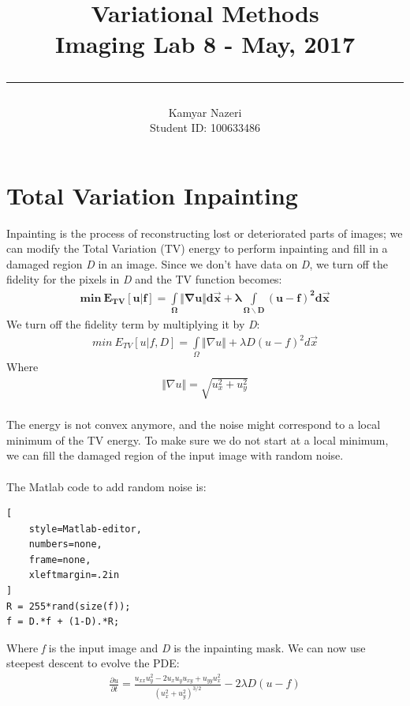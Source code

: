 \documentclass[a4paper,11pt]{article}
\begin{document}
\title{
	\Huge \textbf {Variational Methods}
    \\ [0.2cm]
	\LARGE Imaging Lab 8 - May, 2017
    \\ [0.5cm]
    \hrule
}

\date{}

\author{
		\Large Kamyar Nazeri \\
		\large Student ID: 100633486 }

\maketitle
\newpage

\section*{Total Variation Inpainting}
Inpainting is the process of reconstructing lost or deteriorated parts of images; we can modify the Total Variation (TV) energy to perform inpainting and fill in a damaged region \emph{D} in an image. Since we don't have data on \emph{D}, we turn off the fidelity for the pixels in \emph{D} and the TV function becomes:
\begin{align*}
\boldsymbol{min\ E_{TV}[u|f] = \int\limits_{\Omega} \Vert\nabla u\Vert d\vec{x} + \lambda \int\limits_{\Omega \backslash D} (u-f)^2 d\vec{x}}
\end{align*}
We turn off the fidelity term by multiplying it by \emph{D}:
\begin{align*}
min\ E_{TV}[u|f,D] = \int\limits_{\Omega} \Vert\nabla u\Vert + \lambda D(u-f)^2 d\vec{x}
\end{align*}
Where
\begin{align*}
\Vert\nabla u\Vert = \sqrt{u_x^2 + u_y^2}
\end{align*}
\\The energy is not convex anymore, and the noise might correspond to a local minimum of the TV energy. To make sure we do not start at a local
minimum, we can fill the damaged region of the input image with random noise. 
\\\\The Matlab code to add random noise is:
\begin{lstlisting}[
    style=Matlab-editor,
    numbers=none,
    frame=none,
    xleftmargin=.2in
]
R = 255*rand(size(f)); 
f = D.*f + (1-D).*R;
\end{lstlisting}
Where \emph{f} is the input image and \emph{D} is the inpainting mask. We can now use steepest descent to evolve the PDE:
\begin{align*}
\frac{\partial u}{\partial t} = \frac{u_{xx} u_y^2 - 2 u_x u_y u_{xy} + u_{yy} u_x^2}{(u_x^2 + u_y^2)^{3/2}} - 2 \lambda D(u-f)
\end{align*}
\end{document}
